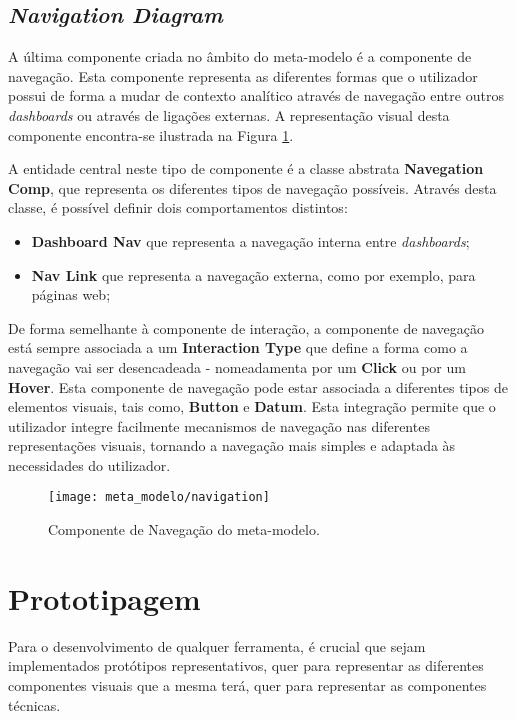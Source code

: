 \subsection{\textit{Navigation Diagram}} %
\label{sub:nav_diagram}

A última componente criada no âmbito do meta-modelo é a componente de navegação. Esta componente representa as diferentes formas que o utilizador possui de forma a mudar de contexto analítico através de navegação entre outros \textit{dashboards} ou através de ligações externas. A representação visual desta componente encontra-se ilustrada na Figura \ref{fig:navigation}.

A entidade central neste tipo de componente é a classe abstrata \textbf{Navegation Comp}, que representa os diferentes tipos de navegação possíveis. Através desta classe, é possível definir dois comportamentos distintos:

\begin{itemize}
    \item \textbf{Dashboard Nav} que representa a navegação interna entre \textit{dashboards};
    \item \textbf{Nav Link} que representa a navegação externa, como por exemplo, para páginas web;
\end{itemize}

De forma semelhante à componente de interação, a componente de navegação está sempre associada a um \textbf{Interaction Type} que define a forma como a navegação vai ser desencadeada - nomeadamenta por um \textbf{Click} ou por um \textbf{Hover}. Esta componente de navegação pode estar associada a diferentes tipos de elementos visuais, tais como, \textbf{Button} e \textbf{Datum}. Esta integração permite que o utilizador integre facilmente mecanismos de navegação nas diferentes representações visuais, tornando a navegação mais simples e adaptada às necessidades do utilizador.

\begin{figure}[htbp]
  \texttt{[image: meta\_modelo/navigation]}
  \centering
  \caption{Componente de Navegação do meta-modelo.}
  \label{fig:navigation}
\end{figure}

\section{Prototipagem} %
\label{sec:prototipagem}

Para o desenvolvimento de qualquer ferramenta, é crucial que sejam implementados protótipos representativos, quer para representar as diferentes componentes visuais que a mesma terá, quer para representar as componentes técnicas.

